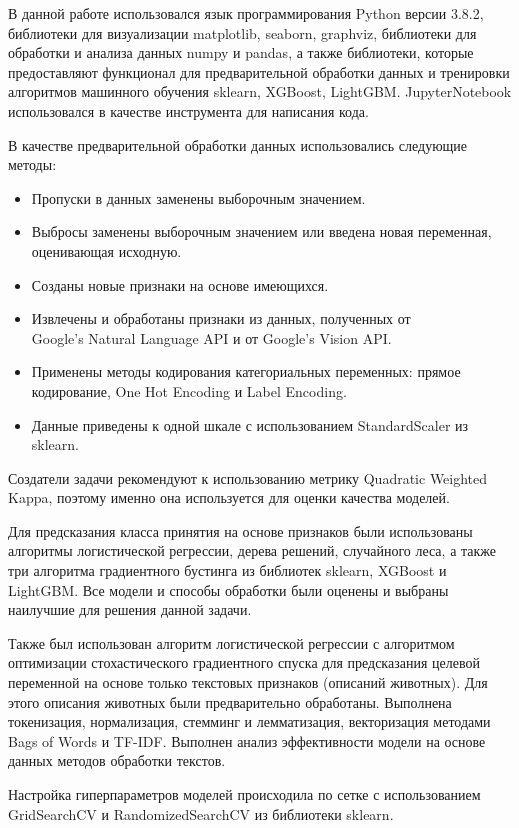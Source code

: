 \documentclass[14pt]{mmcs_article}
\begin{document}
В данной работе использовался язык программирования Python версии 3.8.2, библиотеки для визуализации matplotlib, seaborn, graphviz, библиотеки для обработки и анализа данных numpy и pandas, а также библиотеки, которые предоставляют функционал для предварительной обработки данных и тренировки алгоритмов машинного обучения sklearn, XGBoost, LightGBM. JupyterNotebook использовался в качестве инструмента для написания кода.

В качестве предварительной обработки данных использовались следующие методы: 
\begin{itemize}
	\item Пропуски в данных заменены выборочным значением.
	\item Выбросы заменены выборочным значением или введена новая переменная, оценивающая исходную.
	\item Созданы новые признаки на основе имеющихся.
	\item Извлечены и обработаны признаки из данных, полученных от \\ Google’s Natural Language API и от Google’s Vision API.
	\item Применены методы кодирования категориальных переменных: прямое кодирование, One Hot Encoding и Label Encoding.
	\item Данные приведены к одной шкале с использованием StandardScaler из sklearn.
\end{itemize}

Создатели задачи рекомендуют к использованию метрику Quadratic Weighted Kappa, поэтому именно она используется для оценки качества моделей.

Для предсказания класса принятия на основе признаков были использованы алгоритмы логистической регрессии, дерева решений, случайного леса, а также три алгоритма градиентного бустинга из библиотек sklearn, XGBoost и LightGBM. Все модели и способы обработки были оценены и выбраны наилучшие для решения данной задачи.

Также был использован алгоритм логистической регрессии с алгоритмом оптимизации стохастического градиентного спуска для предсказания целевой переменной на основе только текстовых признаков (описаний животных). Для этого описания животных были предварительно обработаны. Выполнена токенизация, нормализация, стемминг и лемматизация, векторизация методами Bags of Words и TF-IDF. Выполнен анализ эффективности модели на основе данных методов обработки текстов.

Настройка гиперпараметров моделей происходила по сетке с использованием GridSearchCV и RandomizedSearchCV из библиотеки sklearn.
\end{document}
